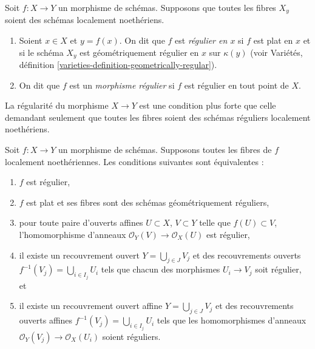 \begin{definition}
\label{definition-regular}
Soit $f : X \to Y$ un morphisme de schémas.
Supposons que toutes les fibres $X_y$ soient des schémas localement noethériens.
\begin{enumerate}
\item Soient $x \in X$ et $y = f(x)$. On dit que $f$ est {\it régulier en $x$}
si $f$ est plat en $x$ et si le schéma $X_y$ est géométriquement
régulier en $x$ sur $\kappa(y)$ (voir
Variétés, définition \ref{varieties-definition-geometrically-regular}).
\item On dit que $f$ est un {\it morphisme régulier} si $f$ est régulier
en tout point de $X$.
\end{enumerate}
\end{definition}

\noindent
La régularité du morphisme $X \to Y$ est une condition
plus forte que celle demandant seulement que toutes les
fibres soient des schémas réguliers localement noethériens.

\begin{lemma}
\label{lemma-regular}
Soit $f : X \to Y$ un morphisme de schémas.
Supposons toutes les fibres de $f$ localement noethériennes.
Les conditions suivantes sont équivalentes :
\begin{enumerate}
\item $f$ est régulier,
\item $f$ est plat et ses fibres sont des schémas géométriquement réguliers,
\item pour toute paire d'ouverts affines $U \subset X$, $V \subset Y$
telle que $f(U) \subset V$, l'homomorphisme d'anneaux $\mathcal{O}_Y(V) \to \mathcal{O}_X(U)$
est régulier,
\item il existe un recouvrement ouvert $Y = \bigcup_{j \in J} V_j$
et des recouvrements ouverts $f^{-1}(V_j) = \bigcup_{i \in I_j} U_i$ tels
que chacun des morphismes $U_i \to V_j$ soit régulier, et
\item il existe un recouvrement ouvert affine $Y = \bigcup_{j \in J} V_j$
et des recouvrements ouverts affines $f^{-1}(V_j) = \bigcup_{i \in I_j} U_i$ tels
que les homomorphismes d'anneaux $\mathcal{O}_Y(V_j) \to \mathcal{O}_X(U_i)$ soient réguliers.
\end{enumerate}
\end{lemma}

